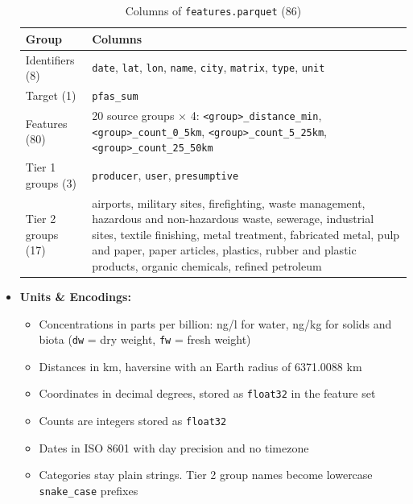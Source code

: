 \documentclass[11pt, a4paper]{article}
\newcommand{\code}[1]{\texttt{#1}}
\begin{document}
\begin{itemize}
    \begin{table}[h]
        \centering
        \small
        \begin{tabularx}{\linewidth}{l X}
            \toprule
            \textbf{Group} & \textbf{Columns} \\
            \midrule
            Identifiers (8) & \code{date}, \code{lat}, \code{lon}, \code{name}, \code{city}, \code{matrix}, \code{type}, \code{unit}  \\
            Target (1) & \code{pfas\_sum} \\
            Features (80) & 20 source groups $\times$ 4: \code{<group>\_distance\_min}, \code{<group>\_count\_0\_5km}, \code{<group>\_count\_5\_25km}, \code{<group>\_count\_25\_50km} \\
            Tier 1 groups (3) & \code{producer}, \code{user}, \code{presumptive} \\
            Tier 2 groups (17) & airports, military sites, firefighting, waste management, hazardous and non-hazardous waste, sewerage, industrial sites, textile finishing, metal treatment, fabricated metal, pulp and paper, paper articles, plastics, rubber and plastic products, organic chemicals, refined petroleum \\
            \bottomrule
        \end{tabularx}
        \caption{Columns of \code{features.parquet} (86)}
        \label{tab:features}
    \end{table}

    \item \textbf{Units \& Encodings:}
    \begin{itemize}
        \item Concentrations in parts per billion: ng/l for water, ng/kg for solids and biota (\code{dw} = dry weight, \code{fw} = fresh weight)
        \item Distances in km, haversine with an Earth radius of 6371.0088 km
        \item Coordinates in decimal degrees, stored as \code{float32} in the feature set
        \item Counts are integers stored as \code{float32}
        \item Dates in ISO 8601 with day precision and no timezone
        \item Categories stay plain strings. Tier 2 group names become lowercase \code{snake\_case} prefixes
    \end{itemize}
\end{itemize}
\end{document}
